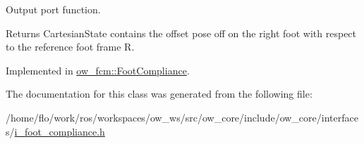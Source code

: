 Output port function. 

\begin{DoxyReturn}{Returns}
Cartesian\+State contains the offset pose off on the right foot with respect to the reference foot frame R. 
\end{DoxyReturn}


Implemented in \hyperlink{classow__fcm_1_1FootCompliance_a660d26f9b3e73e979d05c9ab0a3957da}{ow\+\_\+fcm\+::\+Foot\+Compliance}.



The documentation for this class was generated from the following file\+:\begin{DoxyCompactItemize}
\item 
/home/flo/work/ros/workspaces/ow\+\_\+ws/src/ow\+\_\+core/include/ow\+\_\+core/interfaces/\hyperlink{i__foot__compliance_8h}{i\+\_\+foot\+\_\+compliance.\+h}\end{DoxyCompactItemize}
